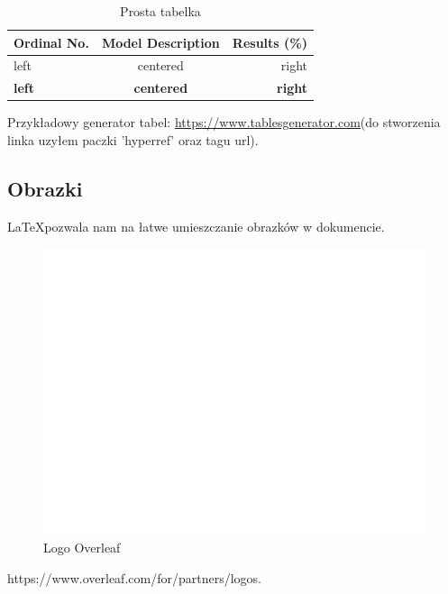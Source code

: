 \documentclass{article}
\begin{document}
\begin{table}[h!]
\centering
\begin{tabular}{|l|c|r|}
\hline
Ordinal No.   & Model Description & Results (\%)   \\
\hline
left          & centered            & right          \\
\hline
\textbf{left} & \textbf{centered}   & \textbf{right} \\
\hline
\end{tabular}
\caption{Prosta tabelka}
\end{table}
Przykładowy generator tabel: \url{https://www.tablesgenerator.com}(do stworzenia
linka uzyłem paczki ’hyperref’ oraz tagu url).
\subsection{Obrazki}
\LaTeX pozwala nam na łatwe umieszczanie obrazków w dokumencie.

\begin{figure}[h!]
    \centering
    \includegraphics[width=0.5\linewidth]{wykres_odpowiedz}
    \caption{Logo Overleaf \cite{picture}}
    \label{fig:enter-label}
\end{figure}


\begin{thebibliography}{9}
https://www.overleaf.com/for/partners/logos.

\end{thebibliography}
\end{document}
